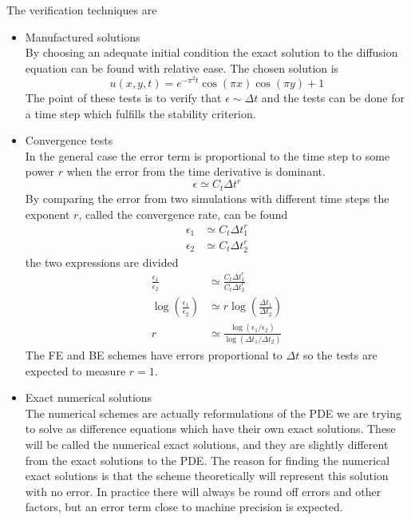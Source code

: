 The verification techniques are

\begin{itemize}
 \item Manufactured solutions\\
 By choosing an adequate initial condition the exact solution to the diffusion equation can be found with relative ease. 
 The chosen solution is
 \begin{equation}\label{manufactured_solution}
  u(x,y,t) = e^{-\pi^2t}\cos(\pi x)\cos(\pi y) +1
 \end{equation}
  The point of these tests is to verify that $\epsilon \sim \Delta t$ and the tests can be done for a time step which fulfills the stability criterion.
  \item Convergence tests \\
  In the general case the error term is proportional to the time step to some power $r$ when the error from the time derivative is dominant.
\begin{equation}
 \epsilon \simeq C_t\Delta t^r
\end{equation}
By comparing the error from two simulations with different time steps the exponent $r$, called the convergence rate, can be found
\begin{align*}
 \epsilon_1 &\simeq C_t\Delta t_1^r\\
  \epsilon_2 &\simeq C_t\Delta t_2^r
  \end{align*}
  the two expressions are divided
  \begin{align*}
   \frac{\epsilon_1}{\epsilon_2} &\simeq \frac{C_t\Delta t_1^r}{C_t\Delta t_2^r}\\
   \log\left(\frac{\epsilon_1}{\epsilon_2}\right) &\simeq r\log\left(\frac{\Delta t_1}{\Delta t_2}\right)\\
   r&\simeq \frac{\log\left(\epsilon_1/\epsilon_2\right)}{\log\left(\Delta t_1/\Delta t_2\right)}
\end{align*}
The FE and BE schemes have errors proportional to $\Delta t$ so the tests are expected to measure $r=1$.
  \item Exact numerical solutions \\
  The numerical schemes are actually reformulations of the PDE we are trying to solve as difference equations which have their own exact solutions. 
  These will be called the numerical exact solutions, and they are slightly different from the exact solutions to the PDE. 
  The reason for finding the numerical exact solutions is that the scheme theoretically will represent this solution with no error. 
  In practice there will always be round off errors and other factors, but an error term close to machine precision is expected.
\end{itemize}

